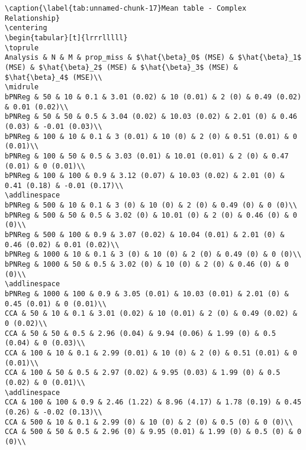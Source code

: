\documentclass[
]{article}
\begin{document}
\begin{verbatim}
\caption{\label{tab:unnamed-chunk-17}Mean table - Complex Relationship}
\centering
\begin{tabular}[t]{lrrrlllll}
\toprule
Analysis & N & M & prop_miss & $\hat{\beta}_0$ (MSE) & $\hat{\beta}_1$ (MSE) & $\hat{\beta}_2$ (MSE) & $\hat{\beta}_3$ (MSE) & $\hat{\beta}_4$ (MSE)\\
\midrule
bPNReg & 50 & 10 & 0.1 & 3.01 (0.02) & 10 (0.01) & 2 (0) & 0.49 (0.02) & 0.01 (0.02)\\
bPNReg & 50 & 50 & 0.5 & 3.04 (0.02) & 10.03 (0.02) & 2.01 (0) & 0.46 (0.03) & -0.01 (0.03)\\
bPNReg & 100 & 10 & 0.1 & 3 (0.01) & 10 (0) & 2 (0) & 0.51 (0.01) & 0 (0.01)\\
bPNReg & 100 & 50 & 0.5 & 3.03 (0.01) & 10.01 (0.01) & 2 (0) & 0.47 (0.01) & 0 (0.01)\\
bPNReg & 100 & 100 & 0.9 & 3.12 (0.07) & 10.03 (0.02) & 2.01 (0) & 0.41 (0.18) & -0.01 (0.17)\\
\addlinespace
bPNReg & 500 & 10 & 0.1 & 3 (0) & 10 (0) & 2 (0) & 0.49 (0) & 0 (0)\\
bPNReg & 500 & 50 & 0.5 & 3.02 (0) & 10.01 (0) & 2 (0) & 0.46 (0) & 0 (0)\\
bPNReg & 500 & 100 & 0.9 & 3.07 (0.02) & 10.04 (0.01) & 2.01 (0) & 0.46 (0.02) & 0.01 (0.02)\\
bPNReg & 1000 & 10 & 0.1 & 3 (0) & 10 (0) & 2 (0) & 0.49 (0) & 0 (0)\\
bPNReg & 1000 & 50 & 0.5 & 3.02 (0) & 10 (0) & 2 (0) & 0.46 (0) & 0 (0)\\
\addlinespace
bPNReg & 1000 & 100 & 0.9 & 3.05 (0.01) & 10.03 (0.01) & 2.01 (0) & 0.45 (0.01) & 0 (0.01)\\
CCA & 50 & 10 & 0.1 & 3.01 (0.02) & 10 (0.01) & 2 (0) & 0.49 (0.02) & 0 (0.02)\\
CCA & 50 & 50 & 0.5 & 2.96 (0.04) & 9.94 (0.06) & 1.99 (0) & 0.5 (0.04) & 0 (0.03)\\
CCA & 100 & 10 & 0.1 & 2.99 (0.01) & 10 (0) & 2 (0) & 0.51 (0.01) & 0 (0.01)\\
CCA & 100 & 50 & 0.5 & 2.97 (0.02) & 9.95 (0.03) & 1.99 (0) & 0.5 (0.02) & 0 (0.01)\\
\addlinespace
CCA & 100 & 100 & 0.9 & 2.46 (1.22) & 8.96 (4.17) & 1.78 (0.19) & 0.45 (0.26) & -0.02 (0.13)\\
CCA & 500 & 10 & 0.1 & 2.99 (0) & 10 (0) & 2 (0) & 0.5 (0) & 0 (0)\\
CCA & 500 & 50 & 0.5 & 2.96 (0) & 9.95 (0.01) & 1.99 (0) & 0.5 (0) & 0 (0)\\

\end{verbatim}
\end{document}

